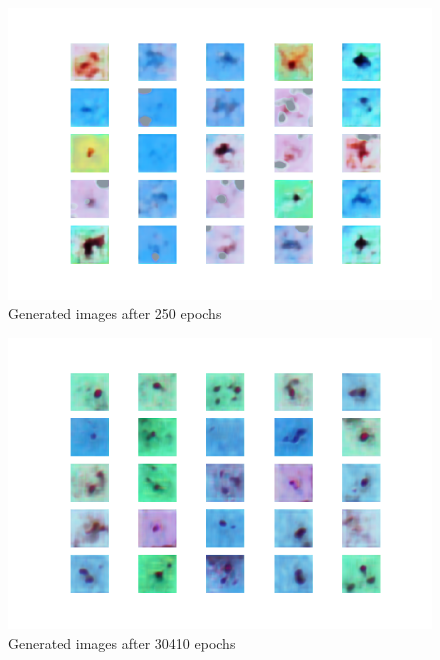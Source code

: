 \begin{figure}[h]
\label{fig:gen250}
\begin{center}
\includegraphics[scale=0.45]{./images/generation/alta_mnist_250.png} \end{center}
\caption{Generated images after 250 epochs}
\end{figure}


\begin{figure}[h]
\label{fig:gen250}
\begin{center}
\includegraphics[scale=0.45]{./images/generation/alta_mnist_30410.png} \end{center}
\caption{Generated images after 30410 epochs}
\end{figure}


